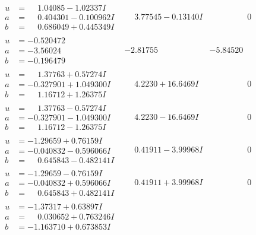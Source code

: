 \documentclass[1p]{elsarticle_modified}
\theoremstyle{definition}
\begin{document}
$$\begin{array}{c|c|c}
\begin{aligned}
u &= \phantom{-}1.04085 - 1.02337 I \\
a &= \phantom{-}0.404301 - 0.100962 I \\
b &= \phantom{-}0.686049 + 0.445349 I\end{aligned}
 & \phantom{-}3.77545 - 0.13140 I & \phantom{-0.000000 } 0 \\ \hline\begin{aligned}
u &= -0.520472\phantom{ +0.000000I} \\
a &= -3.56024\phantom{ +0.000000I} \\
b &= -0.196479\phantom{ +0.000000I}\end{aligned}
 & -2.81755\phantom{ +0.000000I} & -5.84520\phantom{ +0.000000I} \\ \hline\begin{aligned}
u &= \phantom{-}1.37763 + 0.57274 I \\
a &= -0.327901 + 1.049300 I \\
b &= \phantom{-}1.16712 + 1.26375 I\end{aligned}
 & \phantom{-}4.2230 + 16.6469 I & \phantom{-0.000000 } 0 \\ \hline\begin{aligned}
u &= \phantom{-}1.37763 - 0.57274 I \\
a &= -0.327901 - 1.049300 I \\
b &= \phantom{-}1.16712 - 1.26375 I\end{aligned}
 & \phantom{-}4.2230 - 16.6469 I & \phantom{-0.000000 } 0 \\ \hline\begin{aligned}
u &= -1.29659 + 0.76159 I \\
a &= -0.040832 - 0.596066 I \\
b &= \phantom{-}0.645843 - 0.482141 I\end{aligned}
 & \phantom{-}0.41911 - 3.99968 I & \phantom{-0.000000 } 0 \\ \hline\begin{aligned}
u &= -1.29659 - 0.76159 I \\
a &= -0.040832 + 0.596066 I \\
b &= \phantom{-}0.645843 + 0.482141 I\end{aligned}
 & \phantom{-}0.41911 + 3.99968 I & \phantom{-0.000000 } 0 \\ \hline\begin{aligned}
u &= -1.37317 + 0.63897 I \\
a &= \phantom{-}0.030652 + 0.763246 I \\
b &= -1.163710 + 0.673853 I\end{aligned}

\end{array}$$
\end{document}
